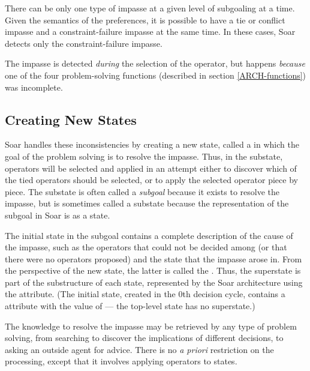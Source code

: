There can be only one type of impasse at a given level of subgoaling at a time. Given the semantics of the preferences, it is possible to have a tie or conflict impasse and a constraint-failure impasse at the same time.  In these cases, Soar detects only the constraint-failure impasse.

The impasse is detected \textit{during} the selection of the operator, but happens \textit{because} one of the four problem-solving functions (described in section \ref{ARCH-functions}) was incomplete.

\subsection{Creating New States}

Soar handles these inconsistencies by creating a new state, called a  in which the goal of the problem solving is to resolve the impasse.  Thus, in the substate, operators will be selected and applied in an attempt either to discover which of the tied operators should be selected, or to apply the selected operator piece by piece.  The substate is often called a \emph{subgoal} because it exists to resolve the impasse, but is sometimes called a substate because the representation of the subgoal in Soar is as a state.

The initial state in the subgoal contains a complete description of the cause of the impasse, such as the operators that could not be decided among (or that there were no operators proposed) and the state that the impasse arose in. From the perspective of the new state, the latter is called the . Thus, the superstate is part of the substructure of each state, represented by the Soar architecture using the  attribute. (The initial state, created in the 0th decision cycle, contains a  attribute with the value of  --- the top-level state has no superstate.)

The knowledge to resolve the impasse may be retrieved by any type of problem solving, from searching to discover the implications of different decisions, to asking an outside agent for advice. There is no \emph{a priori} restriction on the processing, except that it involves applying operators to states.

\begin{figure}
	\label{fig:stack1}
\end{figure}

